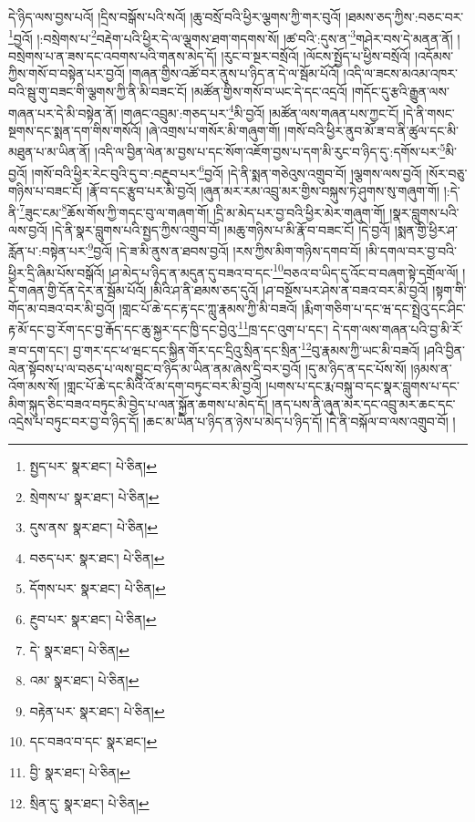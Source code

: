 དེ་ཉིད་ལས་བྱས་པའོ། །དྲིས་བསྒོས་པའི་སའོ། །ཆུ་བསྲོ་བའི་ཕྱིར་ལྕགས་ཀྱི་གར་བུའོ། །ཐམས་ཅད་ཀྱིས་:བཅང་བར་\footnote{སྤྱད་པར་  སྣར་ཐང་།  པེ་ཅིན། }བྱའོ། །:བསྲེགས་པ་\footnote{སྲེགས་པ་  སྣར་ཐང་།  པེ་ཅིན། }བརྡེག་པའི་ཕྱིར་དེ་ལ་ལྕགས་ཐག་གདགས་སོ། །ཚ་བའི་:དུས་ན་\footnote{དུས་ནས་  སྣར་ཐང་།  པེ་ཅིན། }གཤེར་བས་དེ་མནན་ནོ། །བསྲེགས་པ་ན་ཟས་དང་འབགས་པའི་གནས་མེད་དོ། །རུང་བ་སྔར་བསྲོའོ། །ལོངས་སྤྱོད་པ་ཕྱིས་བསྲོའོ། །འདོམས་ཀྱིས་གསོ་བ་བསྟེན་པར་བྱའོ། །གཞན་གྱིས་འཚོ་བར་ནུས་པ་ཉིད་ན་དེ་ལ་སྦོམ་པོའོ། །འདི་ལ་ཟངས་མའམ་འཁར་བའི་སྦུ་གུ་བཟང་གི་ལྕགས་ཀྱི་ནི་མི་བཟང་ངོ། །མཚོན་གྱིས་གསོ་བ་ཡང་དེ་དང་འདྲའོ། །གདོང་དུ་རྩའི་རྒྱུན་ལས་གཞན་པར་དེ་མི་བསྟེན་ནོ། །གཞང་འབྲུམ་:གཅད་པར་\footnote{བཅད་པར་  སྣར་ཐང་།  པེ་ཅིན། }མི་བྱའོ། །མཚོན་ལས་གཞན་པས་ཀྱང་ངོ། །དེ་ནི་གསང་སྔགས་དང་སྨན་དག་གིས་གསོའོ། །ཞེ་འགྲས་པ་གསོར་མི་གཞུག་གོ། །གསོ་བའི་ཕྱིར་ནུབ་མོ་ཟ་བ་ནི་ཚུལ་དང་མི་མཐུན་པ་མ་ཡིན་ནོ། །འདི་ལ་བྱིན་ལེན་མ་བྱས་པ་དང་སོག་འཇོག་བྱས་པ་དག་མི་རུང་བ་ཉིད་དུ་:དགོས་པར་\footnote{དོགས་པར་  སྣར་ཐང་།  པེ་ཅིན། }མི་བྱའོ། །གསོ་བའི་ཕྱིར་རེང་བུའི་དུ་བ་:བརྔུབ་པར་\footnote{རྔུབ་པར་  སྣར་ཐང་།  པེ་ཅིན། }བྱའོ། །དེ་ནི་སྨན་གཅེའུས་འགྲུབ་བོ། །ལྕགས་ལས་བྱའོ། །སོར་བཅུ་གཉིས་པ་བཟང་ངོ། །རྣོ་བ་དང་རྩུབ་པར་མི་བྱའོ། །ཞུན་མར་རམ་འབྲུ་མར་གྱིས་བསྐུས་ཏེ་ཤུགས་སུ་གཞུག་གོ། །:དེ་ནི་\footnote{དེ་  སྣར་ཐང་།  པེ་ཅིན། }ཟུང་ངམ་\footnote{འམ་  སྣར་ཐང་།  པེ་ཅིན། }ཆོས་གོས་ཀྱི་གདང་བུ་ལ་གཞག་གོ། །དྲི་མ་མེད་པར་བྱ་བའི་ཕྱིར་མེར་གཞུག་གོ། །སྣར་བླུགས་པའི་ལས་བྱའོ། །དེ་ནི་སྣར་བླུགས་པའི་སྤྱད་ཀྱིས་འགྲུབ་བོ། །མཆུ་གཉིས་པ་མི་རྣོ་བ་བཟང་ངོ། །དེ་བྱའོ། །སྨན་གྱི་ཕྱིར་ཤ་རློན་པ་:བསྟེན་པར་\footnote{བརྟེན་པར་  སྣར་ཐང་།  པེ་ཅིན། }བྱའོ། །དེ་ཟ་མི་ནུས་ན་ཐབས་བྱའོ། །རས་ཀྱིས་མིག་གཉིས་དགབ་བོ། །མི་དགལ་བར་བྱ་བའི་ཕྱིར་དྲི་ཞིམ་པོས་བསྒོའོ། །ཤ་མེད་པ་ཉིད་ན་མདུན་དུ་བཟའ་བ་དང་\footnote{དང་བཟའ་བ་དང་  སྣར་ཐང་། }བཅའ་བ་ཡིད་དུ་འོང་བ་བཞག་སྟེ་དགྲོལ་ལོ། །དེ་གཞན་གྱི་དོན་དེར་ན་སྦོམ་པོའོ། །མིའི་ཤ་ནི་ཐམས་ཅད་དུའོ། །ཤ་བསྔོས་པར་ཤེས་ན་བཟའ་བར་མི་བྱའོ། །སྟག་གི་གོད་མ་བཟའ་བར་མི་བྱའོ། །གླང་པོ་ཆེ་དང་རྟ་དང་ཀླུ་རྣམས་ཀྱི་མི་བཟའོ། །རྨིག་གཅིག་པ་དང་ཝ་དང་སྤྲེའུ་དང་ཤིང་རྟ་མོ་དང་བྱ་རོག་དང་བྱ་རྒོད་དང་ཆུ་སྐྱར་དང་ཁྱི་དང་བྱེའུ་\footnote{བྱི་  སྣར་ཐང་།  པེ་ཅིན། }ཁྲ་དང་འུག་པ་དང་། དེ་དག་ལས་གཞན་པའི་བྱ་མི་རོ་ཟ་བ་དག་དང་། བྱ་གར་དང་ཕ་ཝང་དང་སྐྱིན་གོར་དང་དྲིའུ་སྲིན་དང་སྲིན་\footnote{སྲིན་དུ་  སྣར་ཐང་།  པེ་ཅིན། }བུ་རྣམས་ཀྱི་ཡང་མི་བཟའོ། །ཤའི་བྱིན་ལེན་སྟོབས་པ་ལ་བཅད་པ་ལས་བྱུང་བ་ཉིད་མ་ཡིན་ནམ་ཞེས་དྲི་བར་བྱའོ། །དུ་མ་ཉིད་ན་དང་པོས་སོ། །ཉམས་ན་འོག་མས་སོ། །གླང་པོ་ཆེ་དང་མིའི་འོ་མ་དག་བཏུང་བར་མི་བྱའོ། །པགས་པ་དང་རྨ་བསྐུ་བ་དང་སྣར་བླུགས་པ་དང་མིག་སྐུད་ཅིང་བཟའ་བཏུང་མི་བྱེད་པ་ལན་སྐྱོན་ཆགས་པ་མེད་དོ། །ནད་པས་ནི་ཞུན་མར་དང་འབྲུ་མར་ཆང་དང་འདྲེས་པ་བཏུང་བར་བྱ་བ་ཉིད་དོ། །ཆང་མ་ཡིན་པ་ཉིད་ན་ཉེས་པ་མེད་པ་ཉིད་དོ། །དེ་ནི་བསྐོལ་བ་ལས་འགྲུབ་བོ། །
